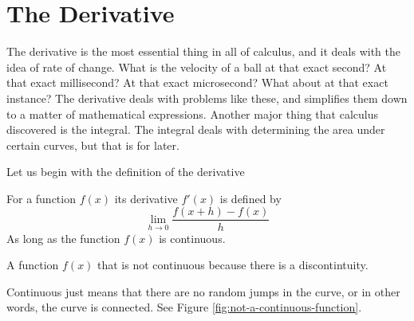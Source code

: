 \documentclass[working]{tuftebook}
\begin{document}
\chapter{The Derivative}
\vspace{-2em}
The derivative is the most essential thing in all of calculus, and it deals with the idea of rate of change. What is the velocity of a ball at that exact second? At that exact millisecond? At that exact microsecond? What about at that exact instance? The derivative deals with problems like these, and simplifies them down to a matter of mathematical expressions. Another major thing that calculus discovered is the integral. The integral deals with determining the area under certain curves, but that is for later. 

Let us begin with the definition of the derivative 
\begin{definition}\label{def:first-principle}
    For a function $f(x)$ its derivative $f'(x)$ is defined by 
    \[
        \lim_{h\to 0} \frac{f(x+h)-f(x)}{h}
    \]
    As long as the function $f(x)$ is continuous.
\end{definition}

\begin{marginfigure}
    \centering
    \caption{A function $f(x)$ that is not continuous because there is a discontintuity.}
    \label{fig:not-a-continuous-function}
\end{marginfigure}

Continuous just means that there are no random jumps in the curve, or in other words, the curve is connected. See Figure \ref{fig:not-a-continuous-function}.
\end{document}
